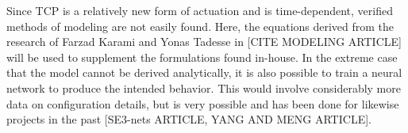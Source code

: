 Since TCP is a relatively new form of actuation and is time-dependent, verified methods of modeling are not easily found. Here, the equations derived from the research of Farzad Karami and Yonas Tadesse in [CITE MODELING ARTICLE] will be used to supplement the formulations found in-house. In the extreme case that the model cannot be derived analytically, it is also possible to train a neural network to produce the intended behavior. This would involve considerably more data on configuration details, but is very possible and has been done for likewise projects in the past [SE3-nets ARTICLE, YANG AND MENG ARTICLE].